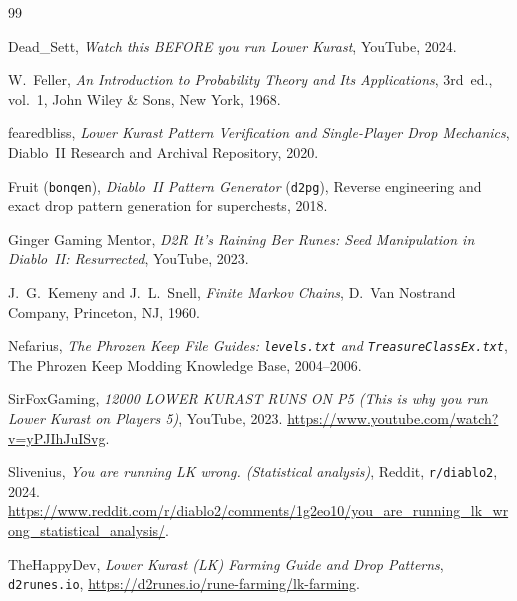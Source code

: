 \documentclass[11pt,reqno]{amsart}
\theoremstyle{definition}
\begin{document}
\begin{thebibliography}{99}

Dead\_Sett, \emph{Watch this BEFORE you run Lower Kurast}, YouTube, 2024.

W.~Feller, \emph{An Introduction to Probability Theory and Its Applications}, 3rd~ed., vol.~1, John Wiley \& Sons, New York, 1968.

fearedbliss, \emph{Lower Kurast Pattern Verification and Single-Player Drop Mechanics}, Diablo~II Research and Archival Repository, 2020.

Fruit (\texttt{bonqen}), \emph{Diablo~II Pattern Generator} (\texttt{d2pg}), Reverse engineering and exact drop pattern generation for superchests, 2018.

Ginger Gaming Mentor, \emph{D2R It's Raining Ber Runes: Seed Manipulation in Diablo~II: Resurrected}, YouTube, 2023.

J.~G.~Kemeny and J.~L.~Snell, \emph{Finite Markov Chains}, D.~Van Nostrand Company, Princeton, NJ, 1960.

Nefarius, \emph{The Phrozen Keep File Guides: \texttt{levels.txt} and \texttt{TreasureClassEx.txt}}, The Phrozen Keep Modding Knowledge Base, 2004--2006.

SirFoxGaming, \emph{12000 LOWER KURAST RUNS ON P5 (This is why you run Lower Kurast on Players 5)}, YouTube, 2023. \url{https://www.youtube.com/watch?v=yPJIhJuISvg}.

Slivenius, \emph{You are running LK wrong. (Statistical analysis)}, Reddit, \texttt{r/diablo2}, 2024. \url{https://www.reddit.com/r/diablo2/comments/1g2eo10/you_are_running_lk_wrong_statistical_analysis/}.

TheHappyDev, \emph{Lower Kurast (LK) Farming Guide and Drop Patterns}, \texttt{d2runes.io}, \url{https://d2runes.io/rune-farming/lk-farming}.

\end{thebibliography}
\end{document}

